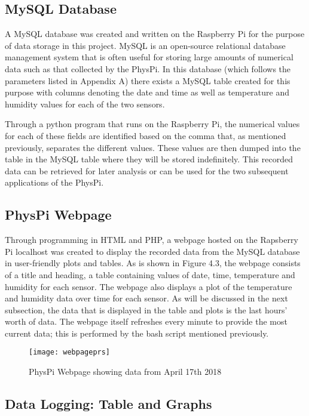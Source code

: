 \documentclass[letterpaper, 11pt]{report}
\begin{document}
\subsection{MySQL Database}

A MySQL database was created and written on the Raspberry Pi for the purpose of data storage in this project.  MySQL is an open-source relational database management system that is often useful for storing large amounts of numerical data such as that collected by the PhysPi.  In this database (which follows the parameters listed in Appendix A) there exists a MySQL table created for this purpose with columns denoting the date and time as well as temperature and humidity values for each of the two sensors.

Through a python program that runs on the Raspberry Pi, the numerical values for each of these fields are identified based on the comma that, as mentioned previously, separates the different values.  These values are then dumped into the table in the MySQL table where they will be stored indefinitely.  This recorded data can be retrieved for later analysis or can be used for the two subsequent applications of the PhysPi.

\subsection{PhysPi Webpage}

Through programming in HTML and PHP, a webpage hosted on the Rapsberry Pi localhost was created to display the recorded data from the MySQL database in user-friendly plots and tables.  As is shown in Figure 4.3, the webpage consists of a title and heading, a table containing values of date, time, temperature and humidity for each sensor.  The webpage also displays a plot of the temperature and humidity data over time for each sensor.  As will be discussed in the next subsection, the data that is displayed in the table and plots is the last hours' worth of data.  The webpage itself refreshes every minute to provide the most current data; this is performed by the bash script mentioned previously.

\begin{figure}[h]
\centering
\texttt{[image: webpageprs]}
\caption{PhysPi Webpage showing data from April 17th 2018}
\end{figure}

\subsection{Data Logging: Table and Graphs}
\end{document}
